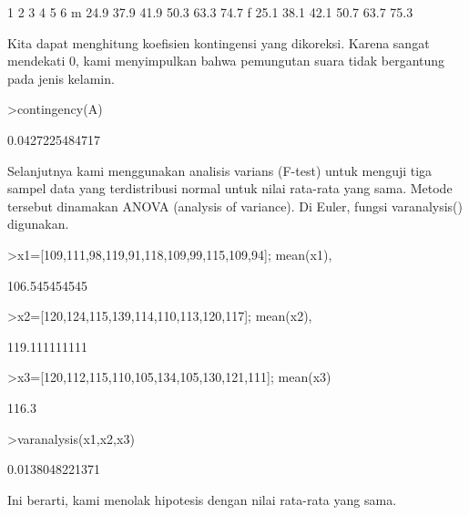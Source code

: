 \documentclass[a4paper,10pt]{article}
\begin{document}
\begin{eulernotebook}
\begin{eulercomment}
\begin{eulercomment}
\begin{eulercomment}
\begin{eulercomment}
\begin{eulercomment}
\begin{eulercomment}
\begin{eulercomment}
\begin{eulercomment}
\begin{eulercomment}
\begin{eulercomment}
\begin{eulercomment}
\begin{eulercomment}
\begin{eulercomment}
\begin{eulercomment}
\begin{eulercomment}
\begin{eulercomment}
\begin{eulercomment}
\begin{eulercomment}
\begin{eulerprompt}
\end{eulerprompt}
\begin{euleroutput}
             1     2     3     4     5     6
       m  24.9  37.9  41.9  50.3  63.3  74.7
       f  25.1  38.1  42.1  50.7  63.7  75.3
\end{euleroutput}
\begin{eulercomment}
Kita dapat menghitung koefisien kontingensi yang dikoreksi. Karena
sangat mendekati 0, kami menyimpulkan bahwa pemungutan suara tidak
bergantung pada jenis kelamin.
\end{eulercomment}
\begin{eulerprompt}
>contingency(A)
\end{eulerprompt}
\begin{euleroutput}
  0.0427225484717
\end{euleroutput}
\begin{eulercomment}
Selanjutnya kami menggunakan analisis varians (F-test) untuk menguji
tiga sampel data yang terdistribusi normal untuk nilai rata-rata yang
sama. Metode tersebut dinamakan ANOVA (analysis of variance). Di
Euler, fungsi varanalysis() digunakan.
\end{eulercomment}
\begin{eulerprompt}
>x1=[109,111,98,119,91,118,109,99,115,109,94]; mean(x1),
\end{eulerprompt}
\begin{euleroutput}
  106.545454545
\end{euleroutput}
\begin{eulerprompt}
>x2=[120,124,115,139,114,110,113,120,117]; mean(x2),
\end{eulerprompt}
\begin{euleroutput}
  119.111111111
\end{euleroutput}
\begin{eulerprompt}
>x3=[120,112,115,110,105,134,105,130,121,111]; mean(x3)
\end{eulerprompt}
\begin{euleroutput}
  116.3
\end{euleroutput}
\begin{eulerprompt}
>varanalysis(x1,x2,x3)
\end{eulerprompt}
\begin{euleroutput}
  0.0138048221371
\end{euleroutput}
\begin{eulercomment}
Ini berarti, kami menolak hipotesis dengan nilai rata-rata yang sama.

\end{eulercomment}
\end{eulercomment}
\end{eulercomment}
\end{eulercomment}
\end{eulercomment}
\end{eulercomment}
\end{eulercomment}
\end{eulercomment}
\end{eulercomment}
\end{eulercomment}
\end{eulercomment}
\end{eulercomment}
\end{eulercomment}
\end{eulercomment}
\end{eulercomment}
\end{eulercomment}
\end{eulercomment}
\end{eulercomment}
\end{eulercomment}
\end{eulernotebook}
\end{document}
